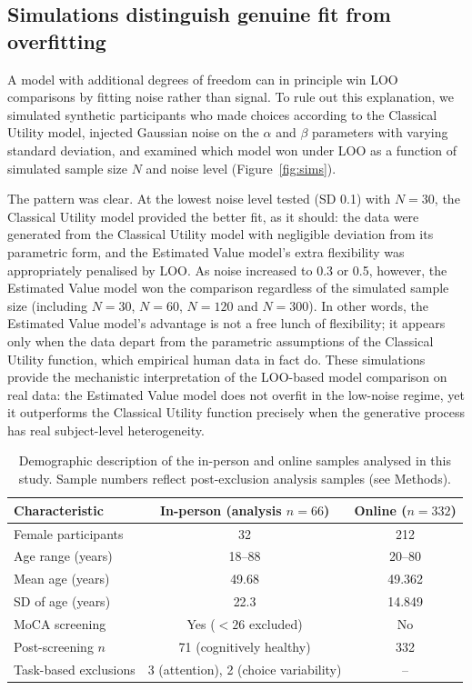 \documentclass[11pt]{article}
\begin{document}
\subsection{Simulations distinguish genuine fit from overfitting}

A model with additional degrees of freedom can in principle win LOO comparisons by fitting noise rather than signal. To rule out this explanation, we simulated synthetic participants who made choices according to the Classical Utility model, injected Gaussian noise on the $\alpha$ and $\beta$ parameters with varying standard deviation, and examined which model won under LOO as a function of simulated sample size $N$ and noise level (Figure~\ref{fig:sims}).

The pattern was clear. At the lowest noise level tested (SD 0.1) with $N = 30$, the Classical Utility model provided the better fit, as it should: the data were generated from the Classical Utility model with negligible deviation from its parametric form, and the Estimated Value model's extra flexibility was appropriately penalised by LOO. As noise increased to 0.3 or 0.5, however, the Estimated Value model won the comparison regardless of the simulated sample size (including $N=30$, $N=60$, $N=120$ and $N=300$). In other words, the Estimated Value model's advantage is not a free lunch of flexibility; it appears only when the data depart from the parametric assumptions of the Classical Utility function, which empirical human data in fact do. These simulations provide the mechanistic interpretation of the LOO-based model comparison on real data: the Estimated Value model does not overfit in the low-noise regime, yet it outperforms the Classical Utility function precisely when the generative process has real subject-level heterogeneity.

\begin{table}[htbp]
\centering
\caption{Demographic description of the in-person and online samples analysed in this study. Sample numbers reflect post-exclusion analysis samples (see Methods).}
\label{tab:demographics}
\begin{tabular}{lcc}
\toprule
Characteristic & In-person (analysis $n=66$) & Online ($n=332$) \\
\midrule
Female participants & 32 & 212 \\
Age range (years) & 18--88 & 20--80 \\
Mean age (years) & 49.68 & 49.362 \\
SD of age (years) & 22.3 & 14.849 \\
MoCA screening & Yes ($<26$ excluded) & No \\
Post-screening $n$ & 71 (cognitively healthy) & 332 \\
Task-based exclusions & 3 (attention), 2 (choice variability) & -- \\
\bottomrule
\end{tabular}
\end{table}
\end{document}
